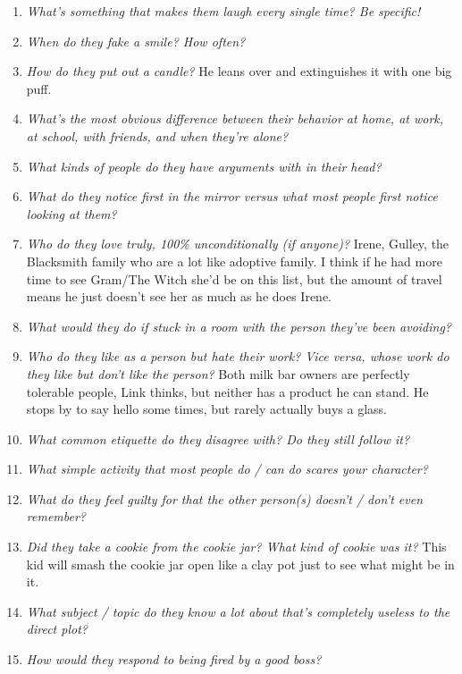 \begin{enumerate}
    \item\textit{What’s something that makes them laugh every single time? Be specific!}
    \item\textit{When do they fake a smile? How often?}
    \item\textit{How do they put out a candle?} He leans over and extinguishes it with one big puff. 
    \item\textit{What’s the most obvious difference between their behavior at home, at work, at school, with friends, and when they’re alone?} 
    \item\textit{What kinds of people do they have arguments with in their head?}
    \item\textit{What do they notice first in the mirror versus what most people first notice looking at them?} 
    \item\textit{Who do they love truly, 100\% unconditionally (if anyone)?} Irene, Gulley, the Blacksmith family who are a lot like adoptive family. I think if he had more time to see Gram/The Witch she'd be on this list, but the amount of travel means he just doesn't see her as much as he does Irene.
    \item\textit{What would they do if stuck in a room with the person they’ve been avoiding?}
    \item\textit{Who do they like as a person but hate their work? Vice versa, whose work do they like but don’t like the person?} Both milk bar owners are perfectly tolerable people, Link thinks, but neither has a product he can stand. He stops by to say hello some times, but rarely actually buys a glass.
    \item\textit{What common etiquette do they disagree with? Do they still follow it?} 
    \item\textit{What simple activity that most people do / can do scares your character?}
    \item\textit{What do they feel guilty for that the other person(s) doesn’t / don’t even remember?}
    \item\textit{Did they take a cookie from the cookie jar? What kind of cookie was it?} This kid will smash the cookie jar open like a clay pot just to see what might be in it.
    \item\textit{What subject / topic do they know a lot about that’s completely useless to the direct plot?}
    \item\textit{How would they respond to being fired by a good boss?}

\end{enumerate}
